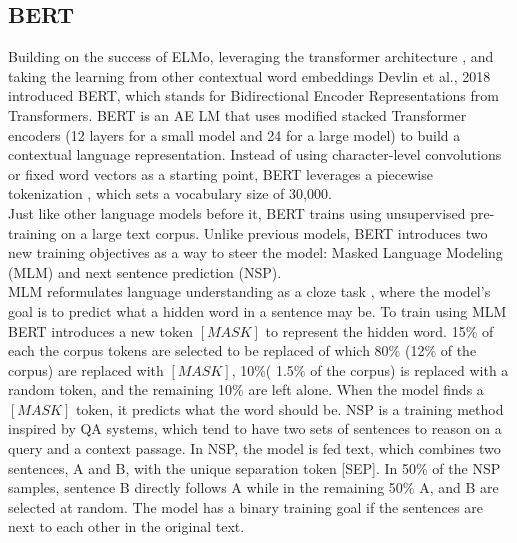 \subsection{BERT}
Building on the success of ELMo, leveraging the transformer architecture \cite{Vaswani2017AttentionIA}, and taking the learning from other contextual word embeddings \cite{Howard2018UniversalLM} \cite{Radford2018ImprovingLU} Devlin et al., 2018 introduced BERT, which stands for Bidirectional Encoder Representations from Transformers. BERT is an AE LM that uses modified stacked Transformer encoders (12 layers for a small model and 24 for a large model) to build a contextual language representation. Instead of using character-level convolutions or fixed word vectors as a starting point, BERT leverages a piecewise tokenization \cite{Wu2016GooglesNM}, which sets a vocabulary size of 30,000.  \\
Just like other language models before it, BERT trains using unsupervised pre-training on a large text corpus. Unlike previous models, BERT introduces two new training objectives as a way to steer the model: Masked Language Modeling (MLM) and next sentence prediction (NSP). \\
MLM reformulates language understanding as a cloze task \cite{Taylor1953ClozePA}, where the model's goal is to predict what a hidden word in a sentence may be. To train using MLM BERT introduces a new token $[MASK]$ to represent the hidden word. 15\% of each the corpus tokens are selected to be replaced of which 80\% (12\% of the corpus) are replaced with $[MASK]$, 10\%( 1.5\% of the corpus) is replaced with a random token, and the remaining 10\% are left alone. When the model finds a $[MASK]$ token, it predicts what the word should be. NSP is a training method inspired by QA systems, which tend to have two sets of sentences to reason on a query and a context passage. In NSP, the model is fed text, which combines two sentences, A and B, with the unique separation token [SEP]. In 50\% of the NSP samples, sentence B directly follows A while in the remaining 50\% A, and B are selected at random. The model has a binary training goal if the sentences are next to each other in the original text.\\
